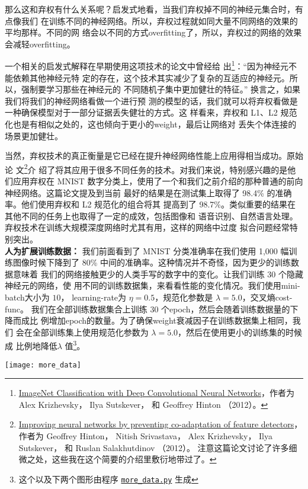 那么这和弃权有什么关系呢？启发式地看，当我们弃权掉不同的神经元集合时，有点像我们
在训练不同的神经网络。所以，弃权过程就如同大量不同网络的效果的平均那样。不同的网
络会以不同的方式\gls*{overfitting}了，所以，弃权过的网络的效果会减轻\gls*{overfitting}。

一个相关的启发式解释\label{dropout_explanation}在早期使用这项技术的论文中曾经给
出\footnote{\href{https://papers.nips.cc/paper/4824-imagenet-classification-with-deep-convolutional-neural-networks.pdf}{ImageNet
    Classification with Deep Convolutional Neural Networks}，作者为 Alex Krizhevsky，
  Ilya Sutskever， 和 Geoffrey Hinton （2012）。}：“因为神经元不能依赖其他神经元特
定的存在，这个技术其实减少了复杂的互适应的神经元。所以，强制要学习那些在神经元的
不同随机子集中更加健壮的特征。” 换言之，如果我们将我们的神经网络看做一个进行预
测的模型的话，我们就可以将弃权看做是一种确保模型对于一部分证据丢失健壮的方式。这
样看来，弃权和 L1、L2 规范化也是有相似之处的，这也倾向于更小的\gls*{weight}，最后让网络对
丢失个体连接的场景更加健壮。

当然，弃权技术的真正衡量是它已经在提升神经网络性能上应用得相当成功。原始论
文\footnote{\href{http://arxiv.org/pdf/1207.0580.pdf}{Improving neural networks
    by preventing co-adaptation of feature detectors}， 作者为 Geoffrey Hinton， Nitish
  Srivastava， Alex Krizhevsky， Ilya Sutskever， 和 Ruslan Salakhutdinov
  （2012）。 注意这篇论文讨论了许多细微之处，这些我在这个简要的介绍里敷衍地带过了。}介
绍了将其应用于很多不同任务的技术。对我们来说，特别感兴趣的是他们应用弃权在 MNIST
数字分类上，使用了一个和我们之前介绍的那种普通的前向神经网络。这篇论文提及到当前
最好的结果是在测试集上取得了 98.4\% 的准确率。他们使用弃权和 L2 规范化的组合将其
提高到了 98.7\%。类似重要的结果在其他不同的任务上也取得了一定的成效，包括图像和
语音识别、自然语言处理。弃权技术在训练大规模深度网络时尤其有用，这样的网络中过度
拟合问题经常特别突出。\\

\textbf{人为扩展训练数据：} 我们前面看到了 MNIST 分类准确率在我们使用 1,000 幅训
练图像时候下降到了 80\% 中间的准确率。这种情况并不奇怪，因为更少的训练数据意味着
我们的网络接触更少的人类手写的数字中的变化。让我们训练 30 个隐藏神经元的网络，使
用不同的训练数据集，来看看性能的变化情况。我们使用\gls*{mini-batch}大小为 $10$，%
\gls*{learning-rate}为 $\eta=0.5$，规范化参数是 $\lambda=5.0$，交叉熵\gls*{cost-func}。
我们在全部训练数据集合上训练 30 个\gls*{epoch}，然后会随着训练数据量的下降而成比
例增加\gls*{epoch}的数量。为了确保\gls*{weight}衰减因子在训练数据集上相同，我们
会在全部训练集上使用规范化参数为 $\lambda = 5.0$，然后在使用更小的训练集的时候成
比例地降低$\lambda$ 值\footnote{这个以及下两个图形由程序
  \href{https://github.com/mnielsen/neural-networks-and-deep-learning/blob/master/fig/more_data.py}{\lstinline!more_data.py!}
  生成}。
\begin{center}
\texttt{[image: more\_data]}
\end{center}

